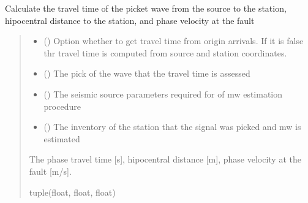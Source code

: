 \documentclass[letterpaper,10pt,english]{sphinxmanual}
\begin{document}
\begin{fulllineitems}
\label{\detokenize{api_support:amw.mw.parameters.get_travel_time}}
\pysigstartsignatures
{}
\pysigstopsignatures
\sphinxAtStartPar
Calculate the travel time of the picket wave from the source to the station,
hipocentral distance to the station, and phase velocity at the fault
\begin{quote}\begin{description}
\begin{itemize}
\item {} 
\sphinxAtStartPar
{} () \textendash{} Option whether to get travel time from origin arrivals.
If it is false thr travel time is computed from source and station coordinates.

\item {} 
\sphinxAtStartPar
{} () \textendash{} The pick of the wave that the travel time is assessed

\item {} 
\sphinxAtStartPar
{} () \textendash{} The seismic source parameters required for of mw estimation procedure

\item {} 
\sphinxAtStartPar
{} () \textendash{} The inventory of the station that the signal was picked and mw is estimated

\end{itemize}

\sphinxAtStartPar
The phase travel time {[}s{]}, hipocentral distance {[}m{]}, phase velocity at the fault {[}m/s{]}.

\sphinxAtStartPar
tuple(float, float, float)

\end{description}\end{quote}

\end{fulllineitems}
\end{document}
